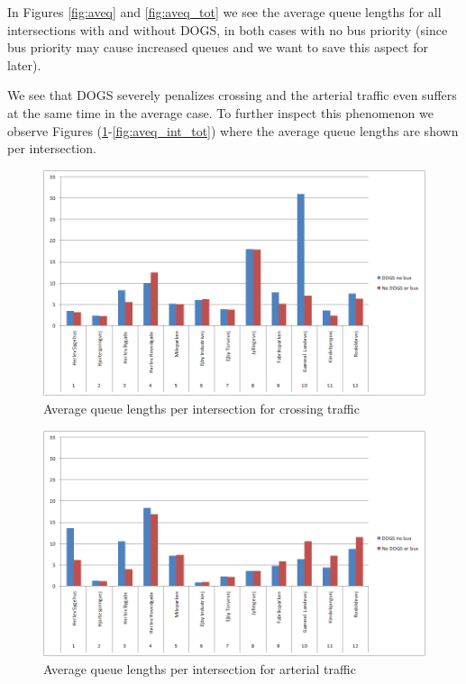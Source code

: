 In Figures \ref{fig:aveq} and \ref{fig:aveq_tot} we see the average queue lengths for all intersections with and without DOGS, in both cases with no bus priority (since bus priority may cause increased queues and we want to save this aspect for later).

We see that DOGS severely penalizes crossing and the arterial traffic even suffers at the same time in the average case. To further inspect this phenomenon we observe Figures (\ref{fig:aveq_int_cross}-\ref{fig:aveq_int_tot}) where the average queue lengths are shown per intersection.

\begin{figure}[ht]
\begin{center}
\includegraphics[scale=0.30]{aveq_intersection_crossing.png} 
\end{center}
\caption{Average queue lengths per intersection for crossing traffic}
\label{fig:aveq_int_cross}
\end{figure}

\begin{figure}[ht]
\begin{center}
\includegraphics[scale=0.30]{aveq_intersection_arterial.png} 
\end{center}
\caption{Average queue lengths per intersection for arterial traffic}
\label{fig:aveq_int_art}
\end{figure}

